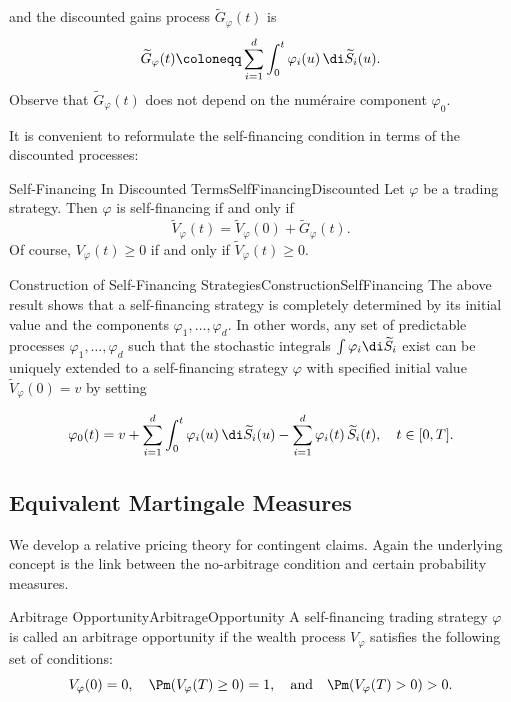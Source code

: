 and the discounted gains process \(\widetilde{G}_{\varphi}(t)\) is
\begin{equation}\label{eq:DiscountedGainsProcess}
	\widetilde{G}_{\varphi}(t) \coloneqq \sum_{i=1}^{d} \int_{0}^{t} \varphi_i(u)\,\di \widetilde{S}_i(u).
\end{equation}
Observe that \(\widetilde{G}_{\varphi}(t)\) does not depend on the num\'{e}raire component \(\varphi_0\).

It is convenient to reformulate the self-financing condition in terms of the discounted processes:

\begin{prop}{Self-Financing In Discounted Terms}{SelfFinancingDiscounted}
	Let \(\varphi\) be a trading strategy. Then \(\varphi\) is self-financing if and only if
	\begin{equation}\label{eq:SelfFinancingDiscounted}
		\widetilde{V}_{\varphi}(t) = \widetilde{V}_{\varphi}(0) + \widetilde{G}_{\varphi}(t).
	\end{equation}
	Of course, \(V_{\varphi}(t) \ge 0\) if and only if \(\widetilde{V}_{\varphi}(t) \ge 0\).
\end{prop}

\begin{xtip}{Construction of Self-Financing Strategies}{ConstructionSelfFinancing}
	The above result shows that a self-financing strategy is completely determined by its initial value and the components \(\varphi_1, \dots, \varphi_d\). In other words, any set of predictable processes \(\varphi_1, \dots, \varphi_d\) such that the stochastic integrals \(\int \varphi_i \di \widetilde{S}_i\) exist can be uniquely extended to a self-financing strategy \(\varphi\) with specified initial value \(\widetilde{V}_{\varphi}(0)=v\) by setting

	\[
		\varphi_0(t) = v + \sum_{i=1}^{d} \int_{0}^{t} \varphi_i(u)\,\di \widetilde{S}_i(u) - \sum_{i=1}^{d} \varphi_i(t)\,\widetilde{S}_i(t), \quad t \in [0,T].
	\]
\end{xtip}

\subsection{Equivalent Martingale Measures}

We develop a relative pricing theory for contingent claims. Again the underlying concept is the link between the no-arbitrage condition and certain probability measures.

\begin{defn}{Arbitrage Opportunity}{ArbitrageOpportunity}
	A self-financing trading strategy \(\varphi\) is called an arbitrage opportunity if the wealth process \(V_{\varphi}\) satisfies the following set of conditions:
	\[
		V_{\varphi}(0) = 0, \quad \Pm(V_{\varphi}(T) \ge 0) = 1, \quad \text{and} \quad \Pm(V_{\varphi}(T) > 0) > 0.
	\]
\end{defn}

